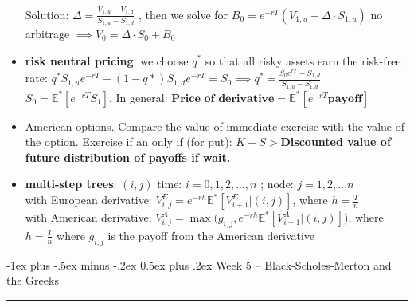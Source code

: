 \documentclass[10pt,landscape,a4paper]{article}
\makeatletter
\renewcommand{\section}{\@startsection{section}{1}{0mm}%
                                {-1ex plus -.5ex minus -.2ex}%
                                {0.5ex plus .2ex}%
                                {\normalfont\large\bfseries}}
\makeatother
\begin{document}
\begin{multicols*}{3}
\begin{description}[topsep=0pt]
\begin{itemize}[topsep=0pt]
 		Solution: $\Delta = \frac{ V_{1,u}- V_{1,d}}{S_{1,u}-S_{1,d}}$ , then we solve for $B_0=e^{-rT}(V_{1,u}-\Delta \cdot  S_{1,u})$
 		no arbitrage $\implies V_0= \Delta  \cdot S_0 + B_0$
 		\item \textbf{risk neutral pricing}: we choose $q^*$ so that all risky assets earn the risk-free rate:
 		$q^*S_{1,u} e^{-rT} + (1-q*)S_{1,d}e^{-rT}=S_0 \implies q^* = \frac{S_0 e^{rT}-S_{1,d}}{S_{1,u}-S_{1,d}}$ \\
 		$S_0 = \mathbb{E}^*[ e^{-rT} S_1]$. In general: $\textbf{Price of derivative} = \mathbb{E}^*[e^{-rT} \textbf{payoff}]$
 		\item American options.  Compare the value of immediate exercise with the value of the option. Exercise if an only if (for put): \textbf{ $K-S>$Discounted value of future distribution of payoffs if wait.}
 		\item \textbf{multi-step trees}:  $(i,j)$ time: $i=0,1,2,\dots, n$ ; node: $j=1,2,...n$ \\
 		with European derivative: $V^E_{i,j} = e^{-rh} \mathbb{E}^*[V^E_{i+1}|(i,j)]$, where $h=\frac{T}{n}$ \\
 		with American derivative: $V^A_{i,j} = \operatorname{max} \Big(g_{i,j}, e^{-rh} \mathbb{E}^*[V^A_{i+1}|(i,j)]\Big)$, where $h=\frac{T}{n}$ where $g_{i,j}$ is the payoff from the American derivative\\
 		
 		
 	\end{itemize}
 \end{description}


\section{Week 5 – Black-Scholes-Merton and the Greeks}\smallskip \hrule height 1pt \smallskip



\end{multicols*}
\end{document}
